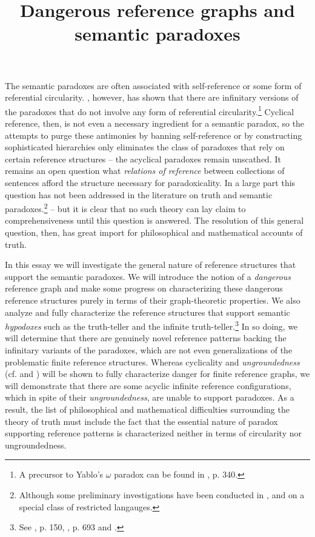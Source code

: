 \documentclass[12pt]{article}
\title{Dangerous reference graphs and semantic paradoxes}
\theoremstyle{remark}
\newcommand{\prg}{\hspace{0.25in}}
\begin{document}

\maketitle



\noindent The semantic paradoxes are often associated with self-reference or some form of referential circularity. \cite{yablo93}, however,  has shown that there are infinitary versions of the paradoxes that do not involve any form of referential circularity.\footnote{A precursor to Yablo's $\omega$ paradox can be found in \cite{yablo85}, p. 340.}  Cyclical reference, then, is not even a necessary ingredient for a semantic paradox, so the attempts to purge these antimonies by banning self-reference or by constructing sophisticated hierarchies only eliminates the class of paradoxes that rely on certain reference structures -- the acyclical paradoxes remain unscathed. It remains an open question what \textit{relations of reference} between collections of sentences afford the structure necessary for paradoxicality. In a large part this question has not been addressed in the literature on truth and semantic paradoxes.\footnote{Although some preliminary investigations have been conducted in \cite{yablo82}, \cite{yablo06} and \cite{cook} on a special class of restricted langauges.} -- but it is clear that no such theory can lay claim to comprehensiveness until this question is answered. The resolution of this general question, then, has great import for philosophical and mathematical accounts of truth.

\prg In this essay we will investigate the general nature of reference structures that support the semantic paradoxes. We will introduce the notion of a \textit{dangerous} reference graph and make some progress on characterizing these dangerous reference structures purely in terms of their graph-theoretic properties.  We also analyze and fully characterize the reference structures that support semantic \textit{hypodoxes} such as the truth-teller and the infinite truth-teller.\footnote{See \cite{herzberger1970}, p. 150, \cite{kripke75}, p. 693 and \cite{burge82}.}  In so doing, we will determine that there are genuinely novel reference patterns backing the infinitary variants of the paradoxes, which are not even generalizations of the problematic finite reference structures.  Whereas cyclicality and \textit{ungroundedness} (cf. \cite{herzberger1970} and \cite{kripke75}) will be shown to fully characterize danger for finite reference graphs, we will demonstrate that there are some acyclic infinite reference configurations, which in spite of their \textit{ungroundedness}, are unable to support paradoxes.  As a result, the list of philosophical and mathematical difficulties surrounding the theory of truth must include the fact that the essential nature of paradox supporting reference patterns is characterized  neither in terms of circularity nor ungroundedness.   
\end{document}
